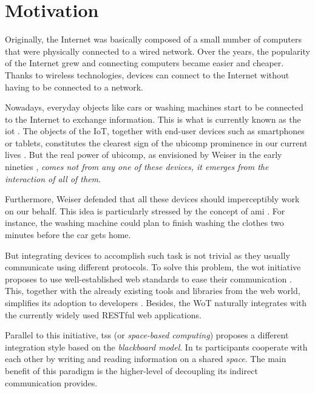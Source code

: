 \section{Motivation}
\label{sec:Motivation}

Originally, the Internet was basically composed of a small number of computers that were physically connected to a wired network.
Over the years, the popularity of the Internet grew and connecting computers became easier and cheaper.
Thanks to wireless technologies, devices can connect to the Internet without having to be connected to a network.

Nowadays, everyday objects like cars or washing machines start to be connected to the Internet to exchange information.
This is what is currently known as the \ac{iot} \cite{atzori_internet_2010}.
The objects of the IoT, together with end-user devices such as smartphones or tablets, constitutes the clearest sign of the \ac{ubicomp} prominence in our current lives \cite{caceres_ubicomp_2012}.
But the real power of \ac{ubicomp}, as envisioned by Weiser in the early nineties \cite{weiser1991computer}, \emph{comes not from any one of these devices, it emerges from the interaction of all of them}.

Furthermore, Weiser defended that all these devices should imperceptibly work on our behalf.
This idea is particularly stressed by the concept of \ac{ami} \cite{ramos_ambient_2008}.
For instance, the washing machine could plan to finish washing the clothes two minutes before the car gets home.

\medskip

But integrating devices to accomplish such task is not trivial as they usually communicate using different protocols.
To solve this problem, the \ac{wot} initiative proposes to use well-established web standards to ease their communication \cite{guinard_thesis_2011}.
This, together with the already existing tools and libraries from the web world, simplifies its adoption to developers \cite{guinard_search_2011}.
Besides, the WoT naturally integrates with the currently widely used RESTful web applications.

Parallel to this initiative, \aclp{ts} (or \emph{space-based computing}) \cite{gelernter_generative_1985} proposes a different integration style based on the \emph{blackboard model}.
In \ac{ts} participants cooperate with each other by writing and reading information on a shared \emph{space}.
The main benefit of this paradigm is the higher-level of decoupling its indirect communication provides. %

